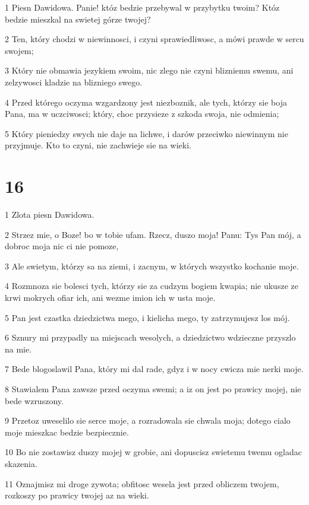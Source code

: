 \par 1 Piesn Dawidowa. Panie! któz bedzie przebywal w przybytku twoim? Któz bedzie mieszkal na swietej górze twojej?
\par 2 Ten, który chodzi w niewinnosci, i czyni sprawiedliwosc, a mówi prawde w sercu swojem;
\par 3 Który nie obmawia jezykiem swoim, nic zlego nie czyni blizniemu swemu, ani zelzywosci kladzie na blizniego swego.
\par 4 Przed którego oczyma wzgardzony jest niezboznik, ale tych, którzy sie boja Pana, ma w uczciwosci; który, choc przysieze z szkoda swoja, nie odmienia;
\par 5 Który pieniedzy swych nie daje na lichwe, i darów przeciwko niewinnym nie przyjmuje. Kto to czyni, nie zachwieje sie na wieki.

\chapter{16}

\par 1 Zlota piesn Dawidowa.
\par 2 Strzez mie, o Boze! bo w tobie ufam. Rzecz, duszo moja! Panu: Tys Pan mój, a dobroc moja nic ci nie pomoze,
\par 3 Ale swietym, którzy sa na ziemi, i zacnym, w których wszystko kochanie moje.
\par 4 Rozmnoza sie bolesci tych, którzy sie za cudzym bogiem kwapia; nie ukusze ze krwi mokrych ofiar ich, ani wezme imion ich w usta moje.
\par 5 Pan jest czastka dziedzictwa mego, i kielicha mego, ty zatrzymujesz los mój.
\par 6 Sznury mi przypadly na miejscach wesolych, a dziedzictwo wdzieczne przyszlo na mie.
\par 7 Bede blogoslawil Pana, który mi dal rade, gdyz i w nocy cwicza mie nerki moje.
\par 8 Stawialem Pana zawsze przed oczyma swemi; a iz on jest po prawicy mojej, nie bede wzruszony.
\par 9 Przetoz uweselilo sie serce moje, a rozradowala sie chwala moja; dotego cialo moje mieszkac bedzie bezpiecznie.
\par 10 Bo nie zostawisz duszy mojej w grobie, ani dopuscisz swietemu twemu ogladac skazenia.
\par 11 Oznajmisz mi droge zywota; obfitosc wesela jest przed obliczem twojem, rozkoszy po prawicy twojej az na wieki.

